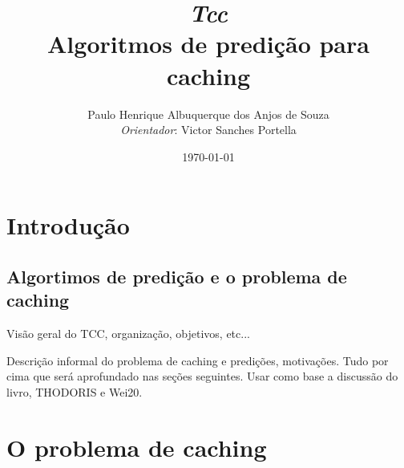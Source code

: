 \documentclass[a4paper,oneside,reqno,12pt]{amsart}
\begin{document}
\baselineskip
\frenchspacing

% 
% 

\setcounter{page}{1}

\title{%
{\small\sl Tcc}\\

\smallskip
Algoritmos de predição para caching}

\author{%
Paulo Henrique Albuquerque dos Anjos de Souza \\
{\tiny\emph{Orientador}:  Victor Sanches Portella}
}
%
%

\date{\today}
\maketitle

\pagestyle{plain}
\footskip=25pt

\vspace{-20pt}


\section{Introdução}

\subsection{Algortimos de predição e o problema de caching}

Visão geral do TCC, organização, objetivos, etc...

Descrição informal do problema de caching e predições, motivações. Tudo por cima que será aprofundado nas seções seguintes. Usar como base a discussão do livro, THODORIS e Wei20.

\section{O problema de caching}
\end{document}
